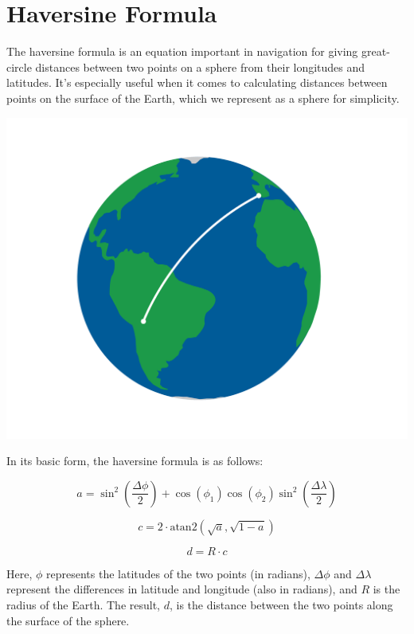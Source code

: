 \section{Haversine Formula}

The haversine formula is an equation important in navigation for
giving great-circle distances between two points on a sphere from
their longitudes and latitudes. It's especially useful when it comes
to calculating distances between points on the surface of the Earth,
which we represent as a sphere for simplicity.

  \includegraphics[width=\textwidth]{haversine.png}


In its basic form, the haversine formula is as follows:

\[
a = \sin^2\left(\frac{\Delta\phi}{2}\right) + \cos(\phi_1)\cos(\phi_2)\sin^2\left(\frac{\Delta\lambda}{2}\right)
\]

\[
c = 2 \cdot \text{atan2} \left( \sqrt{a}, \sqrt{1-a} \right)
\]

\[
d = R \cdot c
\]

Here, $\phi$ represents the latitudes of the two points (in radians),
$\Delta\phi$ and $\Delta\lambda$ represent the differences in latitude
and longitude (also in radians), and $R$ is the radius of the
Earth. The result, $d$, is the distance between the two points along
the surface of the sphere.
